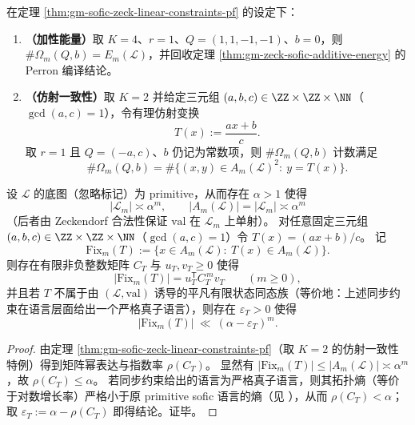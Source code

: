\begin{corollary}\label{cor:gm-linear-constraints-special-cases}
在定理 \ref{thm:gm-sofic-zeck-linear-constraints-pf} 的设定下：
\begin{enumerate}
  \item \textbf{（加性能量）}取 \(K=4\)、\(r=1\)、\(Q=(1,1,-1,-1)\)、\(b=0\)，则 \(\#\Omega_m(Q,b)=E_m(\mathcal{L})\)，并回收定理 \ref{thm:gm-zeck-sofic-additive-energy} 的 Perron 编译结论。
  \item \textbf{（仿射一致性）}取 \(K=2\) 并给定三元组 \((a,b,c)\in\ZZ\times\ZZ\times\NN\)（\(\gcd(a,c)=1\)），令有理仿射变换
  \[
  T(x):=\frac{ax+b}{c}.
  \]
  取 \(r=1\) 且 \(Q=(-a,c)\)、\(b\) 仍记为常数项，则 \(\#\Omega_m(Q,b)\) 计数满足
  \[
  \#\Omega_m(Q,b)=\#\{(x,y)\in A_m(\mathcal{L})^2:\ y=T(x)\}.
  \]
\end{enumerate}
\end{corollary}

\begin{theorem}\label{thm:gm-affine-selfmap-spectral-gap}
设 \(\mathcal{L}\) 的底图（忽略标记）为 primitive，从而存在 \(\alpha>1\) 使得
\[
|\mathcal{L}_m|\asymp \alpha^m,
\qquad
|A_m(\mathcal{L})|=|\mathcal{L}_m|\asymp \alpha^m
\]
（后者由 Zeckendorf 合法性保证 \(\mathrm{val}\) 在 \(\mathcal{L}_m\) 上单射）。
对任意固定三元组 \((a,b,c)\in\ZZ\times\ZZ\times\NN\)（\(\gcd(a,c)=1\)）令 \(T(x)=(ax+b)/c\)。
记
\[
\mathrm{Fix}_m(T):=\{x\in A_m(\mathcal{L}):\ T(x)\in A_m(\mathcal{L})\}.
\]
则存在有限非负整数矩阵 \(C_T\) 与 \(u_T,v_T\ge 0\) 使得
\[
|\mathrm{Fix}_m(T)|=u_T^{\mathsf T}C_T^{\,m}v_T\qquad(m\ge 0),
\]
并且若 \(T\) 不属于由 \((\mathcal{L},\mathrm{val})\) 诱导的平凡有限状态同态族（等价地：上述同步约束在语言层面给出一个严格真子语言），则存在 \(\varepsilon_T>0\) 使得
\[
|\mathrm{Fix}_m(T)|\ \ll\ (\alpha-\varepsilon_T)^m.
\]
\end{theorem}

\begin{proof}
由定理 \ref{thm:gm-sofic-zeck-linear-constraints-pf}（取 \(K=2\) 的仿射一致性特例）得到矩阵幂表达与指数率 \(\rho(C_T)\)。
显然有 \(|\mathrm{Fix}_m(T)|\le |A_m(\mathcal{L})|\asymp\alpha^m\)，故 \(\rho(C_T)\le \alpha\)。
若同步约束给出的语言为严格真子语言，则其拓扑熵（等价于对数增长率）严格小于原 primitive sofic 语言的熵（见 \cite[Chapter~4]{LindMarcus1995}），从而 \(\rho(C_T)<\alpha\)；取 \(\varepsilon_T:=\alpha-\rho(C_T)\) 即得结论。证毕。
\end{proof}

